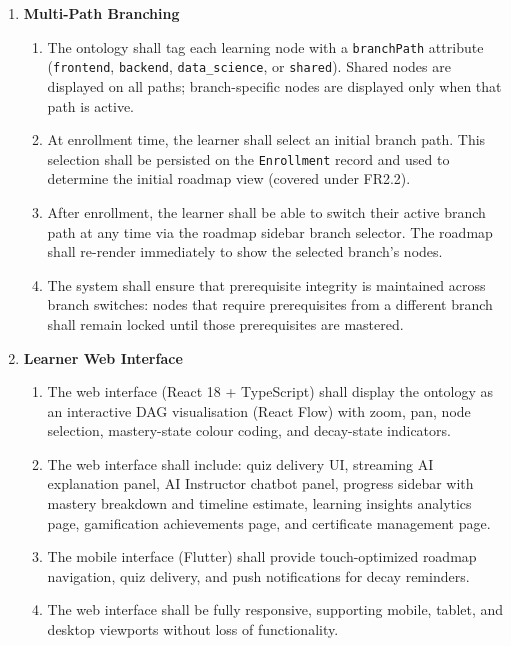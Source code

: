 \begin{enumerate}
    \item[\textbf{FR7:}] \textbf{Multi-Path Branching}
        \begin{enumerate}
            \item[\textbf{FR7.1:}] The ontology shall tag each learning node with a \texttt{branchPath} attribute (\texttt{frontend}, \texttt{backend}, \texttt{data\_science}, or \texttt{shared}). Shared nodes are displayed on all paths; branch-specific nodes are displayed only when that path is active.
            \item[\textbf{FR7.2:}] At enrollment time, the learner shall select an initial branch path. This selection shall be persisted on the \texttt{Enrollment} record and used to determine the initial roadmap view (covered under FR2.2).
            \item[\textbf{FR7.3:}] After enrollment, the learner shall be able to switch their active branch path at any time via the roadmap sidebar branch selector. The roadmap shall re-render immediately to show the selected branch's nodes.
            \item[\textbf{FR7.4:}] The system shall ensure that prerequisite integrity is maintained across branch switches: nodes that require prerequisites from a different branch shall remain locked until those prerequisites are mastered.
        \end{enumerate}

    \item[\textbf{FR8:}] \textbf{Learner Web Interface}
        \begin{enumerate}
            \item[\textbf{FR8.1:}] The web interface (React 18 + TypeScript) shall display the ontology as an interactive DAG visualisation (React Flow) with zoom, pan, node selection, mastery-state colour coding, and decay-state indicators.
            \item[\textbf{FR8.2:}] The web interface shall include: quiz delivery UI, streaming AI explanation panel, AI Instructor chatbot panel, progress sidebar with mastery breakdown and timeline estimate, learning insights analytics page, gamification achievements page, and certificate management page.
            \item[\textbf{FR8.3:}] The mobile interface (Flutter) shall provide touch-optimized roadmap navigation, quiz delivery, and push notifications for decay reminders.
            \item[\textbf{FR8.4:}] The web interface shall be fully responsive, supporting mobile, tablet, and desktop viewports without loss of functionality.
        \end{enumerate}


\end{enumerate}
